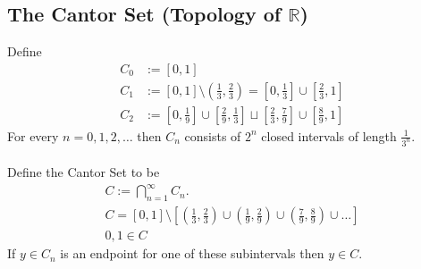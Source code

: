 \documentclass[letterpaper, 12pt]{article}
\newcommand{\reals}{\mathbb{R}}
\begin{document}
    \subsection*{The Cantor Set (Topology of $\reals$)}
    Define
    \begin{align*}
        C_0 &:= [0, 1] \\
        C_1 &:= [0, 1] \setminus \left(\frac{1}{3}, \frac{2}{3}\right) 
        = \left[0, \frac{1}{3}\right] \cup \left[\frac{2}{3}, 1\right] \\
        C_2 &:= \left[0, \frac{1}{9}\right] \cup \left[\frac{2}{9}, \frac{1}{3}\right] 
        \sqcup \left[\frac{2}{3}, \frac{7}{9}\right] \cup \left[\frac{8}{9}, 1\right]
    \end{align*}
    For every $n = 0, 1, 2, \dots$ then $C_n$ consists of $2^n$ closed intervals of length 
    $\frac{1}{3^n}$. \\
    \\
    Define the Cantor Set to be 
    \begin{gather*}
        C := \bigcap_{n=1}^\infty C_n. \\
        C = [0, 1] \setminus [\left(\frac{1}{3}, \frac{2}{3}\right) 
        \cup \left(\frac{1}{9}, \frac{2}{9}\right) 
        \cup \left(\frac{7}{9}, \frac{8}{9}\right)
        \cup \dots] \\
        0, 1 \in C
    \end{gather*}
    If $y \in C_n$ is an endpoint for one of these subintervals then $y \in C$.
\end{document}
